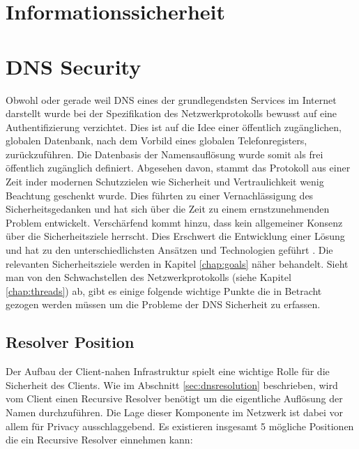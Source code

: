 \section{Informationssicherheit}

\section{DNS Security}
\label{sec:dnssecurity}

Obwohl oder gerade weil DNS eines der grundlegendsten Services im Internet darstellt wurde bei der Spezifikation des Netzwerkprotokolls bewusst auf eine Authentifizierung verzichtet. Dies ist auf die Idee einer öffentlich zugänglichen, globalen Datenbank, nach dem Vorbild eines globalen Telefonregisters, zurückzuführen. Die Datenbasis der Namensauflösung wurde somit als frei öffentlich zugänglich definiert. Abgesehen davon, stammt das Protokoll aus einer Zeit inder modernen Schutzzielen wie Sicherheit und Vertraulichkeit wenig Beachtung geschenkt wurde. Dies führten zu einer Vernachlässigung des Sicherheitsgedanken und hat sich über die Zeit zu einem ernstzunehmenden Problem entwickelt. Verschärfend kommt hinzu, dass kein allgemeiner Konsenz über die Sicherheitsziele herrscht. Dies Erschwert die Entwicklung einer Lösung und hat zu den unterschiedlichsten Ansätzen und Technologien geführt \cite{Grothoff2018}. Die relevanten Sicherheitsziele werden in Kapitel \ref{chap:goals} näher behandelt. Sieht man von den Schwachstellen des Netzwerkprotokolls (siehe Kapitel \ref{chap:threads}) ab, gibt es einige folgende wichtige Punkte die in Betracht gezogen werden müssen um die Probleme der DNS Sicherheit zu erfassen.

\subsection{Resolver Position}
Der Aufbau der Client-nahen Infrastruktur spielt eine wichtige Rolle für die Sicherheit des Clients. Wie im Abschnitt \ref{sec:dnsresolution} beschrieben, wird vom Client einen Recursive Resolver benötigt um die eigentliche Auflösung der Namen durchzuführen. Die Lage dieser Komponente im Netzwerk ist dabei vor allem für Privacy ausschlaggebend. Es existieren insgesamt 5 mögliche Positionen die ein Recursive Resolver einnehmen kann\cite{VanHeugten2018}:

